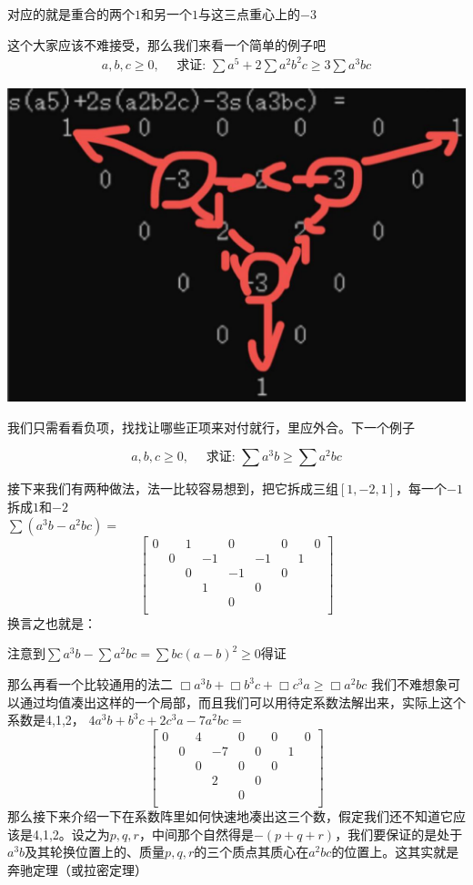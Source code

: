 \documentclass[UTF8]{ctexart}
\begin{document}
对应的就是重合的两个$ 1 $和另一个$ 1 $与这三点重心上的$ -3 $

这个大家应该不难接受，那么我们来看一个简单的例子吧
$$
\begin{gathered}
	a, b, c \geq 0, \quad \text { 求证: } \sum a^{5}+2 \sum a^{2} b^{2} c \geq 3 \sum a^{3} b c
\end{gathered}
$$
\begin{center}
	\includegraphics[width=0.4\linewidth]{120}
\end{center}

我们只需看看负项，找找让哪些正项来对付就行，里应外合。下一个例子

$$ a, b, c \geq 0, \quad \text { 求证: } \sum a^{3} b \geq \sum a^{2} b c
$$

接下来我们有两种做法，法一比较容易想到，把它拆成三组$ [1,-2,1] $，每一个$ -1 $拆成$ 1 $和$ -2 $\\
$ \displaystyle \sum (a^{3} b-a^{2} b c)= $
\renewcommand*{\arraystretch}{1.732}\[\left[\begin{matrix}
	0& &1& &0& &0& &0\\
	&0& &-1& &-1& &1&\\
	& &0& &-1& &0& &\\
	& & &1& &0& & &\\
	& & & &0& & & &\\
\end{matrix}\right]\]
换言之也就是：\\
\begin{center}
	注意到$ \displaystyle \sum a^{3} b-\displaystyle \sum a^{2} b c=\displaystyle \sum b c(a-b)^{2} \geq 0 $得证
\end{center}

那么再看一个比较通用的法二
$ \Box a^{3} b+\Box b^{3} c+\Box c^{3} a \geq \Box a^{2} b c $
我们不难想象可以通过均值凑出这样的一个局部，而且我们可以用待定系数法解出来，实际上这个系数是4,1,2，
$ 4a^{3}b+b^{3}c+2c^{3}a-7a^{2}bc= $\\
\renewcommand*{\arraystretch}{1.732}\[\left[\begin{matrix}
	0& &4& &0& &0& &0\\
	& 0& &-7& &0& &1&\\
	& &0& &0& &0& &\\
	& & &2& &0& & &\\
	& & & &0& & & &\\
\end{matrix}\right]\]
那么接下来介绍一下在系数阵里如何快速地凑出这三个数，假定我们还不知道它应该是4,1,2。设之为$ p,q,r $，中间那个自然得是$ -(p+q+r) $，我们要保证的是处于$ a^{3}b $及其轮换位置上的、质量$ p,q,r $的三个质点其质心在$ a^{2}bc $的位置上。这其实就是奔驰定理（或拉密定理）
\end{document}
